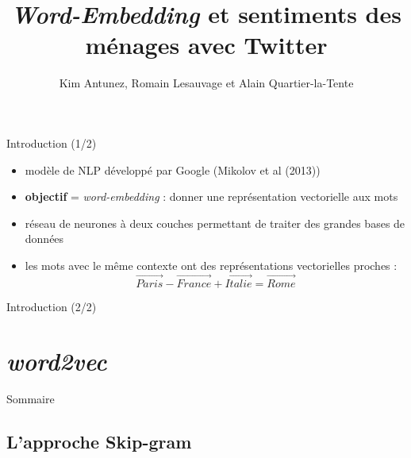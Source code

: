 \documentclass[10pt,xcolor=table,color={dvipsnames,usenames},ignorenonframetext,usepdftitle=false,french]{beamer}
\title{\emph{Word-Embedding} et sentiments des ménages avec Twitter}
\author{Kim Antunez, Romain Lesauvage et Alain Quartier-la-Tente}
\date{}
\begin{document}
\begin{frame}
\titlepage
\end{frame}

\begin{frame}{Introduction (1/2)}
\protect\hypertarget{introduction-12}{}

\begin{itemize}
\item
  modèle de NLP développé par Google (Mikolov et al (2013))
\item
  \textbf{objectif} = \emph{word-embedding} : donner une représentation
  vectorielle aux mots
\end{itemize}

\pause

\begin{itemize}
\item
  \bcloupe réseau de neurones à deux couches permettant de traiter des
  grandes bases de données \pause
\item
  les mots avec le même contexte ont des représentations vectorielles
  proches : \[
  \overrightarrow{Paris} - \overrightarrow{France} + \overrightarrow{Italie} = \overrightarrow{Rome}
  \]
\end{itemize}

\end{frame}

\begin{frame}{Introduction (2/2)}
\protect\hypertarget{introduction-22}{}

\resizebox{\textwidth}{!}{}

\end{frame}

\hypertarget{word2vec}{%
\section{\texorpdfstring{\emph{word2vec}}{word2vec}}\label{word2vec}}

\begin{frame}{Sommaire}
\protect\hypertarget{sommaire}{}


\end{frame}

\hypertarget{lapproche-skip-gram}{%
\subsection{L'approche Skip-gram}\label{lapproche-skip-gram}}
\end{document}
